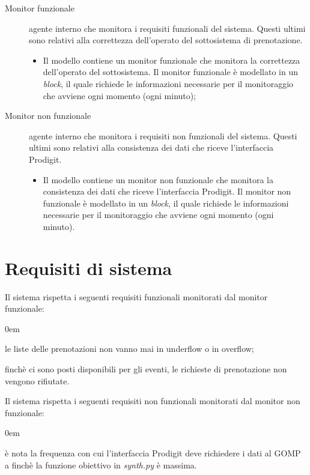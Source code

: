 \documentclass[11pt]{article}
\begin{document}
\begin{description}
\begin{itemize}
		\end{itemize}
		\item [Monitor funzionale] agente interno che monitora i requisiti funzionali del sistema. Questi ultimi sono relativi alla correttezza dell'operato del sottosistema di prenotazione.
		 \begin{itemize}
			\itemsep0em
			\item Il modello contiene un monitor funzionale che monitora la correttezza dell'operato del sottosistema. Il monitor funzionale è modellato in un \textit{block}, il quale richiede le informazioni necessarie per il monitoraggio che avviene ogni momento (ogni minuto);
		\end{itemize}
		\item [Monitor non funzionale] agente interno che monitora i requisiti non funzionali del sistema. Questi ultimi sono relativi alla consistenza dei dati che riceve l'interfaccia Prodigit.
		 \begin{itemize}
			\itemsep0em
			\item Il modello contiene un monitor non funzionale che monitora la consistenza dei dati che riceve l'interfaccia Prodigit. Il monitor non funzionale è modellato in un \textit{block}, il quale richiede le informazioni necessarie per il monitoraggio che avviene ogni momento (ogni minuto).
		\end{itemize}
	\end{description}
	
	\newpage
	\section{Requisiti di sistema}
	Il sistema rispetta i seguenti requisiti funzionali monitorati dal monitor funzionale:
	\begin{description}
		\addtolength{\itemindent}{0.5cm}
		\itemsep0em
		\item [Safety] le liste delle prenotazioni non vanno mai in underflow o in overflow;
		\item [Liveness] finchè ci sono posti disponibili per gli eventi, le richieste di prenotazione non vengono rifiutate.
	\end{description}
	Il sistema rispetta i seguenti requisiti non funzionali monitorati dal monitor non funzionale:
	\begin{description}
		\addtolength{\itemindent}{0.5cm}
		\itemsep0em
		\item [Minima richiesta, massima congruenza dei dati] è nota la frequenza con cui l'interfaccia Prodigit deve richiedere i dati al GOMP a finchè la funzione obiettivo in \textit{synth.py} è massima.
	\end{description}
\end{document}
